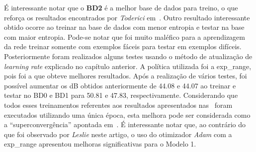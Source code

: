 É interessante notar que o \textbf{BD2} é a melhor base de dados para treino, o que reforça os resultados encontrados por \textit{Toderici} em~\cite{FullResolution2017Toderici}. Outro resultado interessante obtido ocorre ao treinar na base de dados com menor entropia e testar na base com maior entropia. Pode-se notar que foi muito maléfico para a aprendizagem da rede treinar somente com exemplos fáceis para testar em exemplos difíceis. Posteriormente foram realizados alguns testes usando o método de atualização de \textit{learning rate} explicado no capítulo anterior. A política utilizada foi a exp\_range, pois foi a que obteve melhores resultados. Após a realização de vários testes, foi possível aumentar os \acrshort{dB} obtidos anteriormente de 44.08 e 44.07 ao treinar e testar no BD0 e BD1 para 50.81 e 47.83, respectivamente. Considerando que todos esses treinamentos referentes aos resultados apresentados nas~ foram executados utilizando uma única época, esta melhora pode ser considerada como a ``superconvergência'' apontada em~\cite{smith2017cyclical}. É interessante notar que, ao contrário do que foi observado por \textit{Leslie} neste artigo, o uso do otimizador \textit{Adam} com a exp\_range apresentou melhoras significativas para o Modelo 1.
